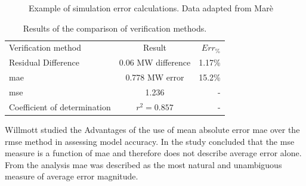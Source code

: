  	\begin{figure}[h!]
 		\centering
 		
 		\caption[Example of simulation error calculations.]{Example of simulation error calculations. Data adapted from Marè \cite{Mare2016PhD}}
 		\label{fig:Philipp Difference verify}
 	\end{figure}
 
 \begin{table}[h!]
 	\label{Philip verification table}
 	\centering
 	\begin{tabular}{lcr}
 		\hline
 		Verification method & Result & $Err_{\%}$\\
 		\hhline{===}
 		Residual Difference          & 0.06 MW difference  & 1.17\% \\
 		\gls{mae} 					 & 0.778 MW error & 15.2\% \\
 		\gls{mse} 				     & 1.236    & -\\
 		Coefficient of determination & $r^2 =0.857$   & -\\
 		\hline
 	\end{tabular} 
 \caption{Results of the comparison of verification methods.}
 \end{table}
 
 	\par 
 	Willmott \cite{willmott2005advantages} studied the Advantages of the use of mean absolute error \gls{mae} over the \gls{rmse} method in assessing model accuracy. In the study \cite{willmott2005advantages} concluded that the \gls{mse} measure is a function of \gls{mae} and therefore does not describe average error alone. From the analysis \gls{mae} was described as the most natural and unambiguous measure of average error magnitude.

